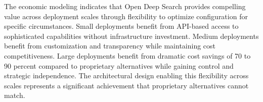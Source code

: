 The economic modeling indicates that Open Deep Search provides compelling value across deployment scales through flexibility to optimize configuration for specific circumstances. Small deployments benefit from API-based access to sophisticated capabilities without infrastructure investment. Medium deployments benefit from customization and transparency while maintaining cost competitiveness. Large deployments benefit from dramatic cost savings of 70 to 90 percent compared to proprietary alternatives while gaining control and strategic independence. The architectural design enabling this flexibility across scales represents a significant achievement that proprietary alternatives cannot match.
